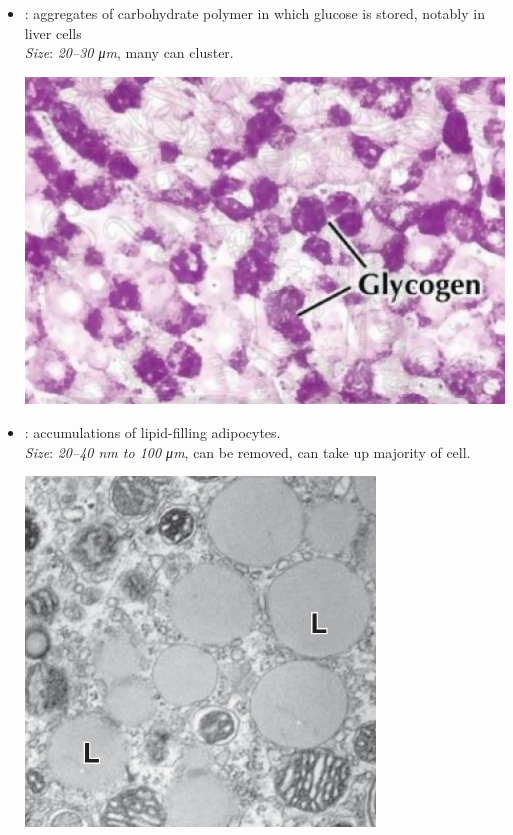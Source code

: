 \begin{multicols}{2}
\begin{itemize}
\begin{center}
  \end{center}
  \item {}: aggregates of carbohydrate polymer in which glucose is stored, notably in liver cells\\
  \textit{Size}: \emph{20--30 \si{\micro m}}, many can cluster.
  \begin{center}
    \hspace{-30pt}\includegraphics[width=0.8\columnwidth]{images/week-1-glycogen.jpg}
  \end{center}
  \item {}: accumulations of lipid-filling adipocytes. \\
  \textit{Size}: \emph{20--40 \si{nm} to 100 \si{\micro m}}, can be removed, can take up majority of cell.
  \begin{center}
    \hspace{-30pt}\includegraphics[width=0.7\columnwidth]{images/week-1-liquid.jpg}
  \end{center}
  \end{itemize}
\end{multicols}

